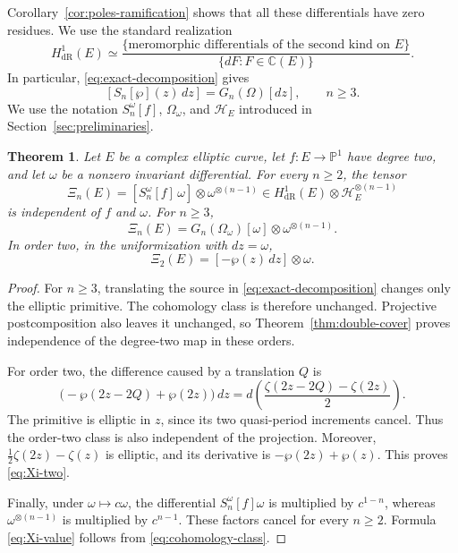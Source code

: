 \documentclass[11pt]{amsart}
\newtheorem{thm}{Theorem}[section]
\theoremstyle{definition}
\theoremstyle{remark}
\numberwithin{equation}{section}
\begin{document}
Corollary~\ref{cor:poles-ramification} shows that all these differentials
have zero residues. We use the standard realization
\cite{hartshorne-derham}
\[
H^1_{\mathrm{dR}}(E)
\simeq
\frac{\{\text{meromorphic differentials of the second kind on }E\}}
{\{dF:F\in\mathbb C(E)\}}.
\]
In particular, \eqref{eq:exact-decomposition} gives
\begin{equation}\label{eq:cohomology-class}
[S_n[\wp](z)\,dz]=G_n(\Omega)[dz],\qquad n\geq3.
\end{equation}
We use the notation $S_n^\omega[f]$, $\Omega_\omega$, and $\mathcal H_E$
introduced in Section~\ref{sec:preliminaries}.

\begin{thm}\label{thm:intrinsic-class}
Let $E$ be a complex elliptic curve, let $f:E\to\mathbb P^1$ have
degree two, and let $\omega$ be a nonzero invariant differential.
For every $n\geq2$, the tensor
\begin{equation}\label{eq:Xi}
\Xi_n(E)
=[S_n^\omega[f]\,\omega]\otimes\omega^{\otimes(n-1)}
\in H^1_{\mathrm{dR}}(E)\otimes\mathcal H_E^{\otimes(n-1)}
\end{equation}
is independent of $f$ and $\omega$. For $n\geq3$,
\begin{equation}\label{eq:Xi-value}
\Xi_n(E)=G_n(\Omega_\omega)[\omega]\otimes\omega^{\otimes(n-1)}.
\end{equation}
In order two, in the uniformization with $dz=\omega$,
\begin{equation}\label{eq:Xi-two}
\Xi_2(E)=[-\wp(z)\,dz]\otimes\omega.
\end{equation}
\end{thm}

\begin{proof}
For $n\geq3$, translating the source in
\eqref{eq:exact-decomposition} changes only the elliptic primitive.
The cohomology class is therefore unchanged. Projective postcomposition
also leaves it unchanged, so Theorem~\ref{thm:double-cover} proves
independence of the degree-two map in these orders.

For order two, the difference caused by a translation $Q$ is
\begin{equation}\label{eq:order-two-translation}
\bigl(-\wp(2z-2Q)+\wp(2z)\bigr)\,dz
=d\!\left(\frac{\zeta(2z-2Q)-\zeta(2z)}2\right).
\end{equation}
The primitive is elliptic in $z$, since its two quasi-period increments
cancel. Thus the order-two class is also independent of the projection.
Moreover, $\tfrac12\zeta(2z)-\zeta(z)$ is elliptic, and its derivative is
$-\wp(2z)+\wp(z)$. This proves \eqref{eq:Xi-two}.

Finally, under $\omega\mapsto c\omega$, the differential
$S_n^\omega[f]\omega$ is multiplied by $c^{1-n}$, whereas
$\omega^{\otimes(n-1)}$ is multiplied by $c^{n-1}$. These factors cancel
for every $n\geq2$. Formula \eqref{eq:Xi-value} follows from
\eqref{eq:cohomology-class}.
\end{proof}
\end{document}
